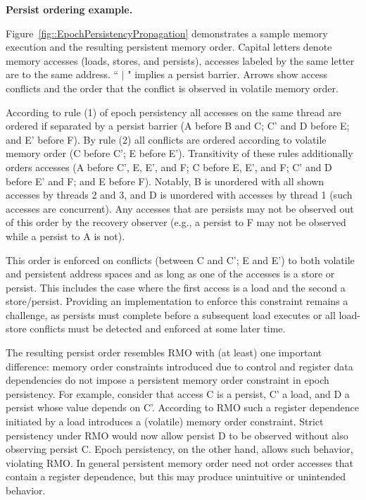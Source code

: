\textbf{Persist ordering example.}

Figure~\ref{fig::EpochPersistencyPropagation} demonstrates a sample memory execution and the resulting persistent memory order.
Capital letters denote memory accesses (loads, stores, and persists), accesses labeled by the same letter are to the same address.
`` $\vert$ " implies a persist barrier.
Arrows show access conflicts and the order that the conflict is observed in volatile memory order.

According to rule (1) of epoch persistency all accesses on the same thread are ordered if separated by a persist barrier (A before B and C; C' and D before E; and E' before F).
By rule (2) all conflicts are ordered according to volatile memory order (C before C'; E before E').
Transitivity of these rules additionally orders accesses (A before C', E, E', and F; C before E, E', and F; C' and D before E' and F; and E before F).
Notably, B is unordered with all shown accesses by threads 2 and 3, and D is unordered with accesses by thread 1 (such accesses are concurrent).
Any accesses that are persists may not be observed out of this order by the recovery observer (e.g., a persist to F may not be observed while a persist to A is not).

This order is enforced on conflicts (between C and C'; E and E') to both volatile and persistent address spaces and as long as one of the accesses is a store or persist.
This includes the case where the first access is a load and the second a store/persist.
Providing an implementation to enforce this constraint remains a challenge, as persists must complete before a subsequent load executes or all load-store conflicts must be detected and enforced at some later time.

The resulting persist order resembles RMO \cite{SPARCv9} with (at least) one important difference: memory order constraints introduced due to control and register data dependencies do not impose a persistent memory order constraint in epoch persistency.
For example, consider that access C is a persist, C' a load, and D a persist whose value depends on C'.
According to RMO such a register dependence initiated by a load introduces a (volatile) memory order constraint.
Strict persistency under RMO would now allow persist D to be observed without also observing persist C.
Epoch persistency, on the other hand, allows such behavior, violating RMO.
In general persistent memory order need not order accesses that contain a register dependence, but this may produce unintuitive or unintended behavior.


